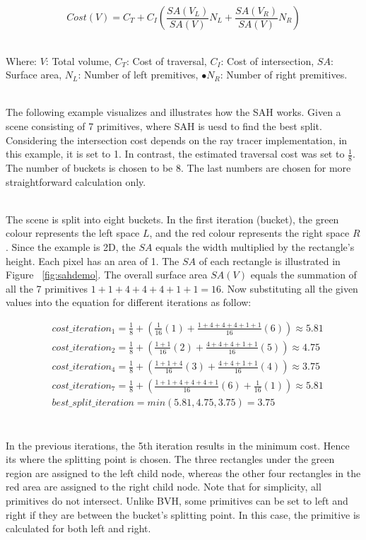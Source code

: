 \documentclass[11pt,a4paper]{article}
\begin{document}
\begin{equation}
Cost(V) = C_T + C_I(\frac{SA(V_L)}{SA(V)}N_L + \frac{SA(V_R)}{SA(V)}N_R)
\end{equation}

\noindent
\\
Where: $V$: Total volume, $C_T$: Cost of traversal, $C_I$: Cost of intersection, $SA$: Surface area, $N_L$: Number of left premitives, $•N_R$: Number of right premitives.

\noindent
\\
The following example visualizes and illustrates how the SAH works. Given a scene consisting of 7 primitives, where SAH is uesd to find the best split. Considering the intersection cost depends on the ray tracer implementation, in this example, it is set to 1. In contrast, the estimated traversal cost was set to $\frac{1}{8}$. The number of buckets is chosen to be 8. The last numbers are chosen for more straightforward calculation only.


\noindent
\\
The scene is split into eight buckets. In the first iteration (bucket), the green colour represents the left space $L$, and the red colour represents the right space $R$. Since the example is 2D, the $SA $ equals the width multiplied by the rectangle's height. Each pixel has an area of 1. The $SA$ of each rectangle is illustrated in Figure ~\ref{fig:sahdemo}. The overall surface area $SA(V)$ equals the summation of all the 7 primitives $1+1+4+4+4+1+1 = 16$. Now substituting all the given values into the equation for different iterations as follow: 


\begin{align*}
& cost\_iteration_1 =  \frac{1}{8} + (\frac{1}{16}(1) +\frac{1+4+4+4+1+1}{16}(6)) \approx 5.81 \\
&cost\_iteration_2 =  \frac{1}{8} + (\frac{1+1}{16}(2) +\frac{4+4+4+1+1}{16}(5)) \approx 4.75 \\
&cost\_iteration_4 =  \frac{1}{8} + (\frac{1+1+4}{16}(3) +\frac{4+4+1+1}{16}(4)) \approx 3.75 \\
&cost\_iteration_7 =  \frac{1}{8} + (\frac{1+1+4+4+4+1}{16}(6) +\frac{1}{16}(1)) \approx 5.81 \\
&best\_split\_iteration = min(5.81, 4.75, 3.75) = 3.75 \\
\end{align*}


\noindent
\\
In the previous iterations, the 5th iteration results in the minimum cost. Hence its where the splitting point is chosen. The three rectangles under the green region are assigned to the left child node, whereas the other four rectangles in the red area are assigned to the right child node. Note that for simplicity, all primitives do not intersect. Unlike BVH, some primitives can be set to left and right if they are between the bucket's splitting point. In this case, the primitive is calculated for both left and right.
\end{document}
